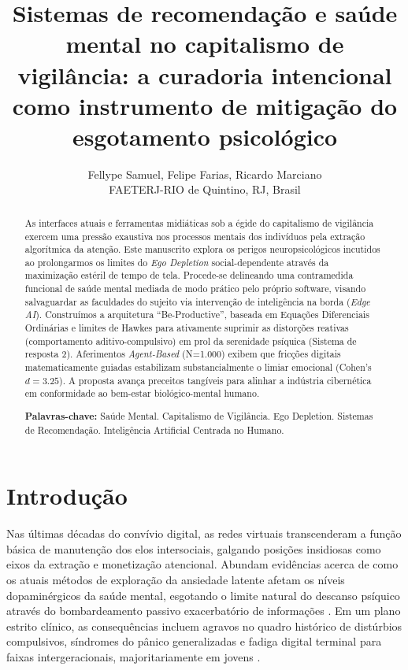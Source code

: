 \documentclass[12pt, a4paper]{article}
\title{Sistemas de recomendação e saúde mental no capitalismo de vigilância: a curadoria intencional como instrumento de mitigação do esgotamento psicológico}
\author{
    Fellype Samuel, Felipe Farias, Ricardo Marciano\\
    FAETERJ-RIO de Quintino, RJ, Brasil
}
\date{}
\begin{document}
\maketitle

\begin{abstract}
\noindent As interfaces atuais e ferramentas midiáticas sob a égide do capitalismo de vigilância exercem uma pressão exaustiva nos processos mentais dos indivíduos pela extração algorítmica da atenção. Este manuscrito explora os perigos neuropsicológicos incutidos ao prolongarmos os limites do \textit{Ego Depletion} social-dependente através da maximização estéril de tempo de tela. Procede-se delineando uma contramedida funcional de saúde mental mediada de modo prático pelo próprio software, visando salvaguardar as faculdades do sujeito via intervenção de inteligência na borda (\textit{Edge AI}). Construímos a arquitetura ``Be-Productive'', baseada em Equações Diferenciais Ordinárias e limites de Hawkes para ativamente suprimir as distorções reativas (comportamento aditivo-compulsivo) em prol da serenidade psíquica (Sistema de resposta 2). Aferimentos \textit{Agent-Based} (N=1.000) exibem que fricções digitais matematicamente guiadas estabilizam substancialmente o limiar emocional (Cohen's $d = 3.25$). A proposta avança preceitos tangíveis para alinhar a indústria cibernética em conformidade ao bem-estar biológico-mental humano.

\vspace{0.5cm}
\noindent\textbf{Palavras-chave:} Saúde Mental. Capitalismo de Vigilância. Ego Depletion. Sistemas de Recomendação. Inteligência Artificial Centrada no Humano.
\end{abstract}

\section{Introdução}

Nas últimas décadas do convívio digital, as redes virtuais transcenderam a função básica de manutenção dos elos intersociais, galgando posições insidiosas como eixos da extração e monetização atencional. Abundam evidências acerca de como os atuais métodos de exploração da ansiedade latente afetam os níveis dopaminérgicos da saúde mental, esgotando o limite natural do descanso psíquico através do bombardeamento passivo exacerbatório de informações \citep{hari2022}. Em um plano estrito clínico, as consequências incluem agravos no quadro histórico de distúrbios compulsivos, síndromes do pânico generalizadas e fadiga digital terminal para faixas intergeracionais, majoritariamente em jovens \citep{costello2023}.
\end{document}
